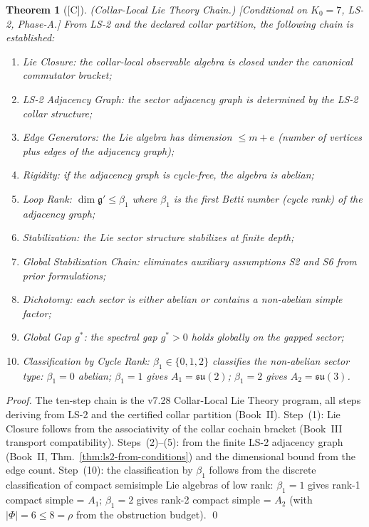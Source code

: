 \documentclass[12pt,oneside]{amsbook}
\theoremstyle{plain}
\newtheorem{theorem}{Theorem}[section]
\theoremstyle{definition}
\theoremstyle{remark}
\newcommand{\status}[1]{\textup{[#1]}}
\begin{document}
\begin{theorem}[\status{C}]\label{thm:sm-collar-lie-chain}
\textup{(Collar-Local Lie Theory Chain.)}
\textup{[Conditional on $K_0=7$, LS-2, Phase-A.]}
From LS-2 and the declared collar partition, the following
chain is established:
\begin{enumerate}[label=\textup{(\arabic*)}]
 \item \emph{Lie Closure}: the collar-local observable algebra
 is closed under the canonical commutator bracket;
 \item \emph{LS-2 Adjacency Graph}: the sector adjacency graph
 is determined by the LS-2 collar structure;
 \item \emph{Edge Generators}: the Lie algebra has dimension
 $\leq m + e$ (number of vertices plus edges of the adjacency
 graph);
 \item \emph{Rigidity}: if the adjacency graph is cycle-free,
 the algebra is abelian;
 \item \emph{Loop Rank}: $\dim \mathfrak{g}' \leq \beta_1$
 where $\beta_1$ is the first Betti number (cycle rank) of
 the adjacency graph;
 \item \emph{Stabilization}: the Lie sector structure stabilizes
 at finite depth;
 \item \emph{Global Stabilization Chain}: eliminates auxiliary
 assumptions S2 and S6 from prior formulations;
 \item \emph{Dichotomy}: each sector is either abelian or
 contains a non-abelian simple factor;
 \item \emph{Global Gap $g^*$}: the spectral gap $g^* > 0$
 holds globally on the gapped sector;
 \item \emph{Classification by Cycle Rank}:
 $\beta_1 \in \{0, 1, 2\}$ classifies the non-abelian sector
 type: $\beta_1 = 0$ abelian; $\beta_1 = 1$ gives $A_1 =
 \mathfrak{su}(2)$; $\beta_1 = 2$ gives $A_2 =
 \mathfrak{su}(3)$.
\end{enumerate}
\end{theorem}

\begin{proof}
The ten-step chain is the v7.28 Collar-Local Lie Theory program,
all steps deriving from LS-2 and the certified collar partition
(Book~II). Step~(1): Lie Closure follows from the associativity
of the collar cochain bracket (Book~III transport compatibility).
Steps~(2)--(5): from the finite LS-2 adjacency graph
(Book~II, Thm.~\ref{thm:ls2-from-conditions}) and the dimensional
bound from the edge count.
Step~(10): the classification by $\beta_1$ follows from the
discrete classification of compact semisimple Lie algebras of
low rank: $\beta_1 = 1$ gives rank-1 compact simple = $A_1$;
$\beta_1 = 2$ gives rank-2 compact simple = $A_2$ (with
$|\Phi| = 6 \leq 8 = \rho$ from the obstruction budget). \qed
\end{proof}
\end{document}
